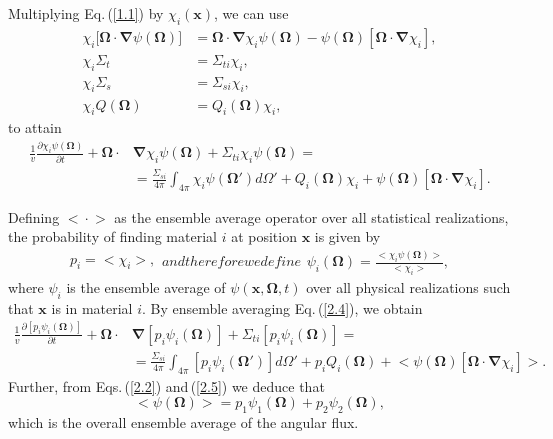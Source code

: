 \documentclass[12pt]{article}
\newcommand{\bl}{\big<}
\newcommand{\bg}{\big>}
\begin{document}
 Multiplying Eq.$\,$(\ref{1.1}) by $\chi_i(\bm x)$, we can use
\begin{subequations}\label{2.3}
\begin{align}
\chi_i\big[\bm\Omega\cdot\bm\nabla\psi(\bm\Omega)\big] &= \bm\Omega\cdot\bm\nabla\chi_i\psi(\bm\Omega)-\psi(\bm\Omega)[\bm\Omega\cdot\bm\nabla\chi_i],
\\ \chi_i\Sigma_t &= \Sigma_{ti}\chi_i,
\\\chi_i\Sigma_s &= \Sigma_{si}\chi_i,
\\\chi_iQ(\bm\Omega) &= Q_i(\bm\Omega)\chi_i,
\end{align}
\end{subequations}
 to attain 
\begin{equation}\label{2.4}
\begin{split}
\frac{1}{v}\frac{\partial \chi_i\psi(\bm\Omega)}{\partial t}+\bm\Omega\cdot &\bm\nabla\chi_i\psi(\bm\Omega) + \Sigma_{ti}\chi_i\psi(\bm\Omega) =
 \\& =\frac{\Sigma_{si}}{4\pi}\int_{4\pi}\chi_i\psi(\bm\Omega')d\Omega'+Q_i(\bm\Omega)\chi_i +
 \psi(\bm\Omega)[\bm\Omega\cdot\bm\nabla\chi_i] .
 \end{split}
\end{equation}

 Defining $\bl \cdot \bg$ as the ensemble average operator over all statistical realizations, the probability of finding material $i$ at position $\bm x$ is given by
\begin{subequations}\label{2.5}
\begin{align}
 p_i = \bl\chi_i\bg,
\end{align}
and therefore we define
\begin{align}\label{2.5b}
\psi_i(\bm\Omega) = \frac{\bl\chi_i\psi(\bm\Omega)\bg}{\bl\chi_i\bg},
\end{align}
\end{subequations}
where $\psi_i$ is the ensemble average of $\psi(\bm x,\bm\Omega,t)$ over all physical realizations such that $\bm x$ is in material $i$.
By ensemble averaging Eq.$\,$(\ref{2.4}), we obtain 
\begin{equation}\label{2.6}
\begin{split}
\frac{1}{v}\frac{\partial [p_i\psi_i(\bm\Omega)]}{\partial t}+ \bm\Omega\cdot &\bm\nabla[p_i\psi_i(\bm\Omega)] + \Sigma_{ti}[p_i\psi_i(\bm\Omega)] =
\\& =
 \frac{\Sigma_{si}}{4\pi}\int_{4\pi}[p_i\psi_i(\bm\Omega')]d\Omega'+p_iQ_i(\bm\Omega) +
 \bl\psi(\bm\Omega)[\bm\Omega\cdot\bm\nabla\chi_i]\bg .
\end{split}
\end{equation}
 Further, from Eqs.$\,$(\ref{2.2}) and$\,$(\ref{2.5}) we deduce that
\begin{equation}\label{2.7}
\bl\psi(\bm\Omega)\bg = p_1\psi_1(\bm\Omega) + p_2\psi_2(\bm\Omega),
\end{equation}
which is the overall ensemble average of the angular flux.
\end{document}
